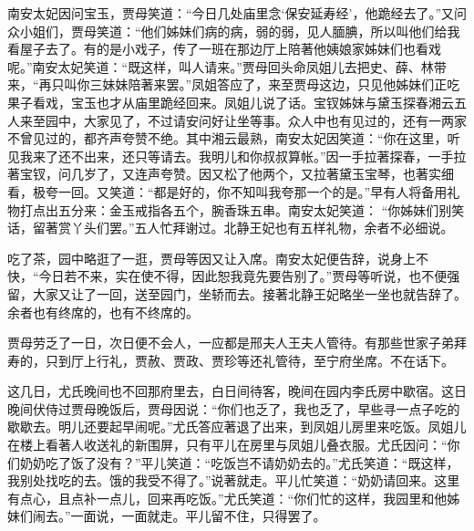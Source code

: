 \begin{parag}
    南安太妃因问宝玉，贾母笑道：“今日几处庙里念‘保安延寿经’，他跪经去了。”又问众小姐们，贾母笑道：“他们姊妹们病的病，弱的弱，见人腼腆，所以叫他们给我看屋子去了。有的是小戏子，传了一班在那边厅上陪著他姨娘家姊妹们也看戏呢。”南安太妃笑道：“既这样，叫人请来。”贾母回头命凤姐儿去把史、薛、林带来，“再只叫你三妹妹陪著来罢。”凤姐答应了，来至贾母这边，只见他姊妹们正吃果子看戏，宝玉也才从庙里跪经回来。凤姐儿说了话。宝钗姊妹与黛玉探春湘云五人来至园中，大家见了，不过请安问好让坐等事。众人中也有见过的，还有一两家不曾见过的，都齐声夸赞不绝。其中湘云最熟，南安太妃因笑道：“你在这里，听见我来了还不出来，还只等请去。我明儿和你叔叔算帐。”因一手拉著探春，一手拉著宝钗，问几岁了，又连声夸赞。因又松了他两个，又拉著黛玉宝琴，也著实细看，极夸一回。又笑道：“都是好的，你不知叫我夸那一个的是。”早有人将备用礼物打点出五分来：金玉戒指各五个，腕香珠五串。南安太妃笑道： “你姊妹们别笑话，留著赏丫头们罢。”五人忙拜谢过。北静王妃也有五样礼物，余者不必细说。
\end{parag}


\begin{parag}
    吃了茶，园中略逛了一逛，贾母等因又让入席。南安太妃便告辞，说身上不快，“今日若不来，实在使不得，因此恕我竟先要告别了。”贾母等听说，也不便强留，大家又让了一回，送至园门，坐轿而去。接著北静王妃略坐一坐也就告辞了。余者也有终席的，也有不终席的。
\end{parag}


\begin{parag}
    贾母劳乏了一日，次日便不会人，一应都是邢夫人王夫人管待。有那些世家子弟拜寿的，只到厅上行礼，贾赦、贾政、贾珍等还礼管待，至宁府坐席。不在话下。
\end{parag}


\begin{parag}
    这几日，尤氏晚间也不回那府里去，白日间待客，晚间在园内李氏房中歇宿。这日晚间伏侍过贾母晚饭后，贾母因说：“你们也乏了，我也乏了，早些寻一点子吃的歇歇去。明儿还要起早闹呢。”尤氏答应著退了出来，到凤姐儿房里来吃饭。凤姐儿在楼上看著人收送礼的新围屏，只有平儿在房里与凤姐儿叠衣服。尤氏因问：“你们奶奶吃了饭了没有？”平儿笑道：“吃饭岂不请奶奶去的。”尤氏笑道：“既这样，我别处找吃的去。饿的我受不得了。”说著就走。平儿忙笑道：“奶奶请回来。这里有点心，且点补一点儿，回来再吃饭。”尤氏笑道：“你们忙的这样，我园里和他姊妹们闹去。”一面说，一面就走。平儿留不住，只得罢了。
\end{parag}


